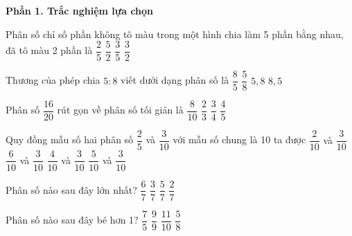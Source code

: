 \textbf{Phần 1. Trắc nghiệm lựa chọn}

\begin{ex} %
Phân số chỉ số phần không tô màu trong một hình chia làm 5 phần bằng nhau, đã tô màu 2 phần là
\choice
{$\dfrac{2}{5}$}
{$\dfrac{5}{2}$}
{\True $\dfrac{3}{5}$}
{$\dfrac{3}{2}$}
\end{ex}

\begin{ex} %
Thương của phép chia $5 : 8$ viết dưới dạng phân số là
\choice
{$\dfrac{8}{5}$}
{\True $\dfrac{5}{8}$}
{$5{,}8$}
{$8{,}5$}
\end{ex}

\begin{ex} %
Phân số $\dfrac{16}{20}$ rút gọn về phân số tối giản là
\choice
{$\dfrac{8}{10}$}
{$\dfrac{2}{3}$}
{$\dfrac{3}{4}$}
{\True $\dfrac{4}{5}$}
\end{ex}

\begin{ex} %
Quy đồng mẫu số hai phân số $\dfrac{2}{5}$ và $\dfrac{3}{10}$ với mẫu số chung là 10 ta được
\choice
{$\dfrac{2}{10}$ và $\dfrac{3}{10}$}
{$\dfrac{6}{10}$ và $\dfrac{3}{10}$}
{\True $\dfrac{4}{10}$ và $\dfrac{3}{10}$}
{$\dfrac{5}{10}$ và $\dfrac{3}{10}$}
\end{ex}

\begin{ex} %
Phân số nào sau đây lớn nhất?
\choice
{\True $\dfrac{6}{7}$}
{$\dfrac{3}{7}$}
{$\dfrac{5}{7}$}
{$\dfrac{2}{7}$}
\end{ex}

\begin{ex} %
Phân số nào sau đây bé hơn 1?
\choice
{$\dfrac{7}{5}$}
{$\dfrac{9}{9}$}
{$\dfrac{11}{10}$}
{\True $\dfrac{5}{8}$}
\end{ex}

